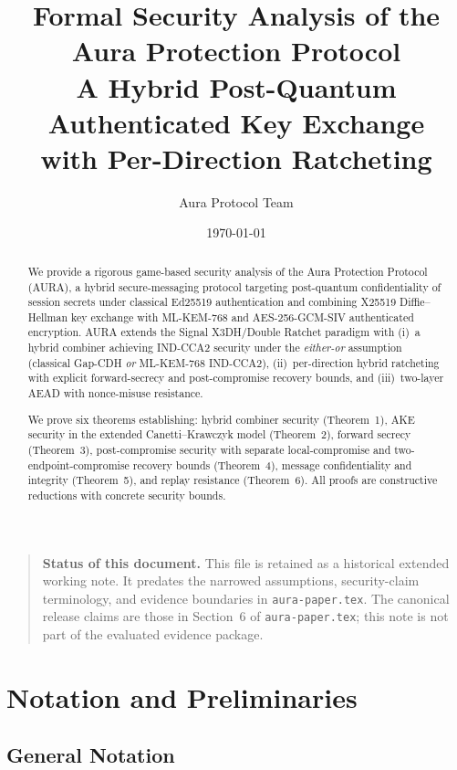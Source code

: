 \documentclass[11pt,a4paper]{article}
\title{\textbf{Formal Security Analysis of the\\Aura Protection Protocol}\\[6pt]
\large A Hybrid Post-Quantum Authenticated Key Exchange\\with Per-Direction Ratcheting}
\author{Aura Protocol Team}
\date{\today}
\theoremstyle{definition}
\theoremstyle{remark}
\begin{document}
\maketitle

\begin{quote}
\textbf{Status of this document.} This file is retained as a historical extended
working note. It predates the narrowed assumptions, security-claim terminology,
and evidence boundaries in \texttt{aura-paper.tex}. The canonical release claims
are those in Section~6 of \texttt{aura-paper.tex}; this note is not part of the
evaluated evidence package.
\end{quote}

\begin{abstract}
We provide a rigorous game-based security analysis of the Aura Protection
Protocol (AURA), a hybrid secure-messaging protocol targeting post-quantum
confidentiality of session secrets under classical Ed25519 authentication and
combining X25519 Diffie--Hellman key exchange with ML-KEM-768 and AES-256-GCM-SIV
authenticated encryption.  AURA extends the Signal X3DH/Double Ratchet paradigm
with (i)~a hybrid combiner achieving IND-CCA2 security under the
\emph{either-or} assumption (classical Gap-CDH \emph{or} ML-KEM-768 IND-CCA2),
(ii)~per-direction hybrid ratcheting with explicit forward-secrecy and
post-compromise recovery bounds, and (iii)~two-layer AEAD with nonce-misuse
resistance.

We prove six theorems establishing: hybrid combiner security (Theorem~1), AKE
security in the extended Canetti--Krawczyk model (Theorem~2), forward secrecy
(Theorem~3), post-compromise security with separate local-compromise and
two-endpoint-compromise recovery bounds (Theorem~4), message confidentiality
and integrity (Theorem~5), and replay resistance (Theorem~6).  All proofs are
constructive reductions with concrete security bounds.
\end{abstract}

\tableofcontents
\newpage


\section{Notation and Preliminaries}
\label{sec:prelim}

\subsection{General Notation}
\end{document}
